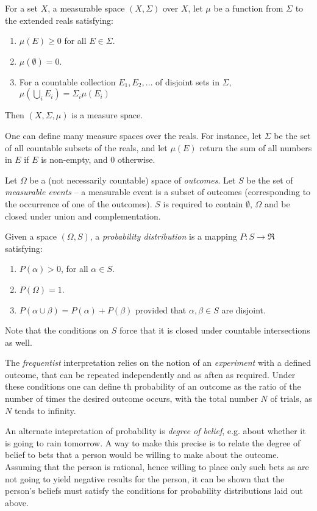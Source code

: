 \documentclass{article}
\begin{document}
\begin{definition} For a set $X$, a measurable space $(X,\Sigma)$ over $X$, let $\mu$ be a function from $\Sigma$ to the extended reals satisfying:
  \begin{enumerate}
  \item $\mu(E) \geq 0$ for all $E \in \Sigma$.
  \item $\mu(\emptyset)=0$.
  \item For a countable collection $E_1, E_2, \ldots$ of disjoint sets in $\Sigma$, $\mu(\bigcup_i E_i)=\Sigma_i \mu(E_i)$
  \end{enumerate}
Then $(X,\Sigma,\mu)$ is a measure space.
\end{definition}
One can define many measure spaces over the reals. For instance, let $\Sigma$ be the set of all countable subsets of the reals, and let $\mu(E)$ return the sum of all numbers in $E$ if $E$ is non-empty, and $0$ otherwise. 

\begin{definition}
  Let $\Omega$ be a (not necessarily countable) space of {\em outcomes}. Let $S$ be the set of {\em measurable events} -- a measurable event is a subset of outcomes (corresponding to the occurrence of one of the outcomes). $S$ is required to contain $\emptyset$, $\Omega$ and be closed under union and complementation. 

  Given a space $(\Omega, S)$, a {\em probability distribution} is a mapping $P:S \rightarrow \Re$ satisfying:
  \begin{enumerate}
  \item $P(\alpha) > 0$, for all $\alpha \in S$.
  \item $P(\Omega)=1$.
    \item $P(\alpha \cup \beta) = P(\alpha) + P(\beta)$ provided that $\alpha, \beta \in S$ are disjoint.
  \end{enumerate}
\end{definition}
Note that the conditions on $S$ force that it is closed under countable intersections as well.

The {\em frequentist} interpretation relies on the notion of an {\em experiment} with a defined outcome, that can be repeated independently and as aften as required. Under these conditions one can define th probability of an outcome as the ratio of the number of times the desired outcome occurs, with the total number $N$ of trials, as $N$ tends to infinity.

An alternate intepretation of probability is {\em degree of belief}, e.g.{} about whether it is going to rain tomorrow.  A way to make this precise is to relate the degree of belief to bets that a person would be willing to make about the outcome. Assuming that the person is rational, hence willing to place only such bets as are not going to yield negative results for the person, it can be shown that the person's beliefs must satisfy the conditions for probability distributions laid out above.
\end{document}
